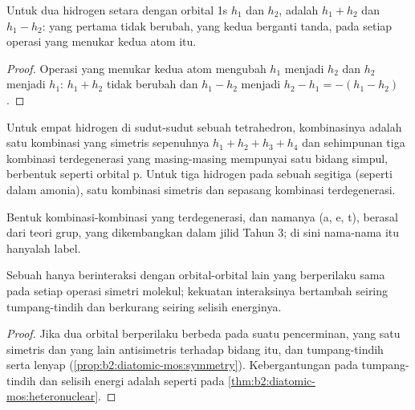 \begin{proposition}\label{prop:b2:fragment-orbitals:h2-pair}
Untuk dua hidrogen setara dengan orbital 1s $h_1$ dan $h_2$,  adalah $h_1 + h_2$ dan $h_1 - h_2$: yang pertama tidak
berubah, yang kedua berganti tanda, pada setiap operasi yang menukar kedua
atom itu.
\end{proposition}

\begin{proof}
Operasi yang menukar kedua atom mengubah $h_1$ menjadi $h_2$ dan $h_2$
menjadi $h_1$: $h_1 + h_2$ tidak berubah dan $h_1 - h_2$ menjadi
$h_2 - h_1 = -(h_1 - h_2)$.
\end{proof}

\begin{proposition}\label{prop:b2:fragment-orbitals:h4}
Untuk empat hidrogen di sudut-sudut sebuah tetrahedron, kombinasinya
adalah satu kombinasi yang simetris sepenuhnya $h_1 + h_2 + h_3 + h_4$ dan
sehimpunan tiga kombinasi terdegenerasi yang masing-masing mempunyai satu
bidang simpul, berbentuk seperti orbital p. Untuk tiga hidrogen pada sebuah
segitiga (seperti dalam amonia), satu kombinasi simetris dan sepasang
kombinasi terdegenerasi.
\end{proposition}

\admitted

Bentuk kombinasi-kombinasi yang terdegenerasi, dan namanya (a, e, t),
berasal dari teori grup, yang dikembangkan dalam jilid Tahun 3; di sini
nama-nama itu hanyalah label.

\begin{proposition}\label{prop:b2:fragment-orbitals:interaction-rules}
Sebuah  hanya berinteraksi dengan orbital-orbital 
lain yang berperilaku sama pada setiap operasi simetri molekul; kekuatan
interaksinya bertambah seiring tumpang-tindih dan berkurang seiring
selisih energinya.
\end{proposition}

\begin{proof}
Jika dua orbital berperilaku berbeda pada suatu pencerminan, yang satu
simetris dan yang lain antisimetris terhadap bidang itu, dan tumpang-tindih
serta  lenyap (\cref{prop:b2:diatomic-mos:symmetry}).
Kebergantungan pada tumpang-tindih dan selisih energi adalah seperti pada
\cref{thm:b2:diatomic-mos:heteronuclear}.
\end{proof}

